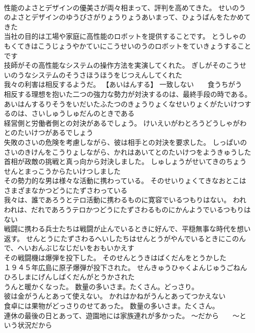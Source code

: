 \documentclass[8pt]{extreport}
\begin{document}
\begin{CJK}{UTF8}{min}
\\	性能のよさとデザインの優美さが両々相まって、評判を高めてきた。	せいのうのよさとデザインのゆうびさがりょうりょうあいまって、ひょうばんをたかめてきた 
\\	当社の目的は工場や家庭に高性能のロボットを提供することです。	とうしゃのもくてきはこうじょうやかていにこうせいのうのロボットをていきょうすることです 
\\	技師がその高性能なシステムの操作方法を実演してくれた。	ぎしがそのこうせいのうなシステムのそうさほうほうをじつえんしてくれた 
\\	我々の利害は相反するようだ。	【あいはんする】 一致しない　　食うちがう
\\	相反する理想を抱いた二つの強力な勢力が対決するのは、最終手段の時である。	あいはんするりそうをいだいたふたつのきょうりょくなせいりょくがたいけつするのは、さいしゅうしゅだんのときである 
\\	経営側と労働者側との対決があるでしょう。	けいえいがわとろうどうしゃがわとのたいけつがあるでしょう 
\\	失敗のさいの危険を考慮しながら、彼は相手との対決を要求した。	しっぱいのさいのきけんをこうりょしながら、かれはあいてとのたいけつをようきゅうした 
\\	首相が政敵の挑戦と真っ向から対決しました。	しゅしょうがせいてきのちょうせんとまっこうからたいけつしました 
\\	その勢力的な男は様々な活動に携わっている。	そのせいりょくてきなおとこはさまざまなかつどうにたずさわっている 
\\	我々は、誰であろうとテロ活動に携わるものに寛容でいるつもりはない。	われわれは、だれであろうテロかつどうにたずさわるものにかんようでいるつもりはない 
\\	戦闘に携わる兵士たちは戦闘が止んでいるときに好んで、平穏無事な時代を想い返す。	せんとうにたずさわるへいしたちはせんとうがやんでいるときにこのんで、へいおんぶじなじだいをおもいかえす 
\\	その戦闘機は爆弾を投下した。	そのせんとうきはばくだんをとうかした 
\\	１９４５年広島に原子爆弾が投下された。	せんきゅうひゃくよんじゅうごねんひろしまにげんしばくだんがとうかされた 
\\	うんと暖かくなった。	数量の多いさま。たくさん。どっさり。
\\	彼は金がうんとあって使えない。	かれはかねがうんとあってつかえない 
\\	食卓には果物がどっさりのせてあった。	数量の多いさま。たくさん。
\\	連休の最後の日とあって、遊園地には家族連れが多かった。	～だから　　～という状況だから

\end{CJK}
\end{document}
